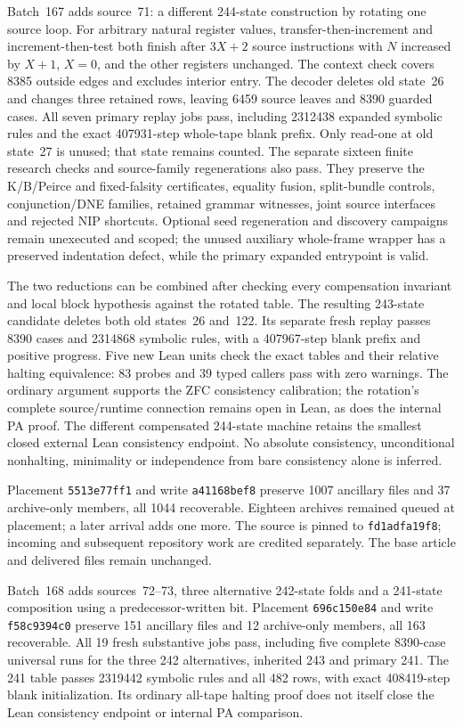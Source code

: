 \documentclass[11pt]{article}
\begin{document}
{Batch~167 adds source~71: a different 244-state construction by rotating one
source loop. For arbitrary natural register values, transfer-then-increment
and increment-then-test both finish after $3X+2$ source instructions with
$N$ increased by $X+1$, $X=0$, and the other registers unchanged. The context
check covers 8385 outside edges and excludes interior entry. The decoder
deletes old state~26 and changes three retained rows, leaving 6459 source
leaves and 8390 guarded cases. All seven primary replay jobs pass, including
2312438 expanded symbolic rules and the exact 407931-step whole-tape blank
prefix. Only read-one at old state~27 is unused; that state remains counted.
The separate sixteen finite research checks and source-family regenerations
also pass. They preserve the K/B/Peirce and fixed-falsity certificates,
equality fusion, split-bundle controls, conjunction/DNE families, retained
grammar witnesses, joint source interfaces and rejected NIP shortcuts.
Optional seed regeneration and discovery campaigns remain unexecuted and
scoped; the unused auxiliary whole-frame wrapper has a preserved indentation
defect, while the primary expanded entrypoint is valid.

The two reductions can be combined after checking every compensation
invariant and local block hypothesis against the rotated table. The resulting
243-state candidate deletes both old states~26 and~122. Its separate fresh
replay passes 8390 cases and 2314868 symbolic rules, with a 407967-step blank
prefix and positive progress. Five new Lean units check the exact tables and
their relative halting equivalence: 83 probes and 39 typed callers pass with
zero warnings. The ordinary argument supports the ZFC consistency calibration;
the rotation's complete source/runtime connection remains open in Lean, as
does the internal PA proof. The different compensated 244-state machine
retains the smallest closed external Lean consistency endpoint. No absolute
consistency, unconditional nonhalting, minimality or independence from bare
consistency alone is inferred.

Placement \texttt{5513e77ff1} and write \texttt{a41168bef8} preserve 1007 ancillary
files and 37 archive-only members, all 1044 recoverable. Eighteen archives
remained queued at placement; a later arrival adds one more. The source is
pinned to \texttt{fd1adfa19f8}; incoming and subsequent repository work are
credited separately. The base article and delivered files remain unchanged.


Batch~168 adds sources~72--73, three alternative 242-state folds and a
241-state composition using a predecessor-written bit. Placement
\texttt{696c150e84} and write \texttt{f58c9394c0} preserve 151 ancillary
files and 12 archive-only members, all 163 recoverable. All 19 fresh
substantive jobs pass, including five complete 8390-case universal runs
for the three 242 alternatives, inherited 243 and primary 241. The 241 table
passes 2319442 symbolic rules and all 482 rows, with exact 408419-step blank
initialization. Its ordinary all-tape halting proof does not itself close the
Lean consistency endpoint or internal PA comparison.

}
\end{document}
